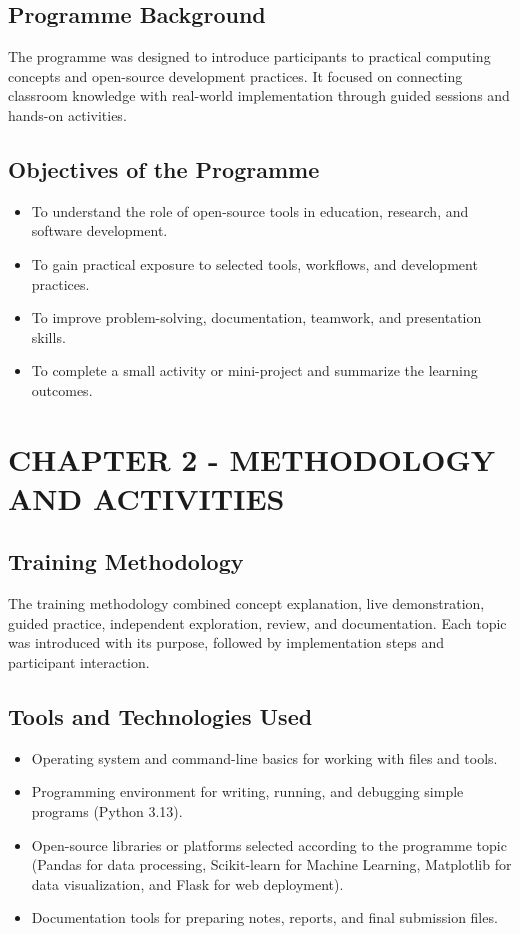 \documentclass[12pt, a4paper]{article}
\begin{document}
\subsection{Programme Background}
The programme was designed to introduce participants to practical computing concepts and open-source development practices. It focused on connecting classroom knowledge with real-world implementation through guided sessions and hands-on activities.

\subsection{Objectives of the Programme}
\begin{itemize}
    \item To understand the role of open-source tools in education, research, and software development.
    \item To gain practical exposure to selected tools, workflows, and development practices.
    \item To improve problem-solving, documentation, teamwork, and presentation skills.
    \item To complete a small activity or mini-project and summarize the learning outcomes.
\end{itemize}

\newpage

\section{CHAPTER 2 - METHODOLOGY AND ACTIVITIES}\label{chap2}

\subsection{Training Methodology}
The training methodology combined concept explanation, live demonstration, guided practice, independent exploration, review, and documentation. Each topic was introduced with its purpose, followed by implementation steps and participant interaction.

\subsection{Tools and Technologies Used}
\begin{itemize}
    \item Operating system and command-line basics for working with files and tools.
    \item Programming environment for writing, running, and debugging simple programs (Python 3.13).
    \item Open-source libraries or platforms selected according to the programme topic (Pandas for data processing, Scikit-learn for Machine Learning, Matplotlib for data visualization, and Flask for web deployment).
    \item Documentation tools for preparing notes, reports, and final submission files.
\end{itemize}
\end{document}
